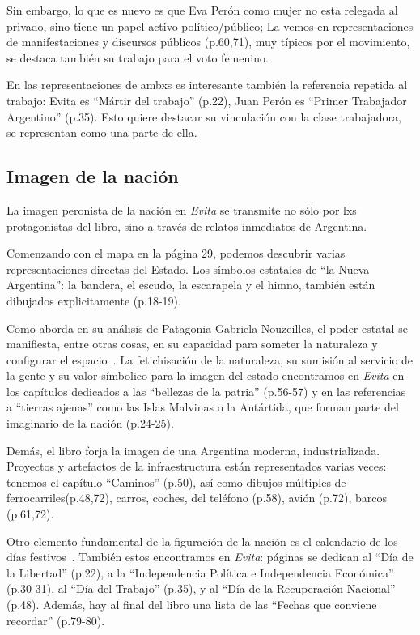 \documentclass[
10pt, %
a4paper, %
oneside, %
headinclude,footinclude, %
]{scrartcl}
\begin{document}
Sin embargo, lo que es nuevo es que Eva Perón como mujer no esta relegada al privado, sino tiene un papel activo político/público;
La vemos en representaciones de manifestaciones y discursos públicos (p.60,71), muy típicos por el movimiento, se destaca también su trabajo para el voto femenino.

En las representaciones de ambxs es interesante también la referencia repetida al trabajo:
Evita es ``Mártir del trabajo'' (p.22),
Juan Perón es ``Primer Trabajador Argentino'' (p.35).
Esto quiere destacar su vinculación con la clase trabajadora, se representan como una parte de ella.


\subsection{Imagen de la nación}

La imagen peronista de la nación en \textit{Evita} se transmite no sólo por lxs protagonistas del libro, sino a través de relatos inmediatos de Argentina.

Comenzando con el mapa en la página 29, podemos descubrir varias representaciones directas del Estado.
Los símbolos estatales de ``la Nueva Argentina'': la bandera, el escudo, la escarapela y el himno, también están dibujados explicitamente (p.18-19).

Como aborda en su análisis de Patagonia Gabriela Nouzeilles, el poder estatal se manifiesta, entre otras cosas, en su capacidad para someter la naturaleza y configurar el espacio~\autocite{Nou1999}.
La fetichisación de la naturaleza, su sumisión al servicio de la gente y su valor símbolico para la imagen del estado encontramos en \textit{Evita} en los capítulos dedicados a las ``bellezas de la patria'' (p.56-57) y en las referencias a ``tierras ajenas'' como las Islas Malvinas o la Antártida, que forman parte del imaginario de la nación (p.24-25).

Demás, el libro forja la imagen de una Argentina moderna, industrializada.
Proyectos y artefactos de la infraestructura están representados varias veces:
tenemos el capítulo ``Caminos'' (p.50), así como dibujos múltiples de ferrocarriles(p.48,72), carros, coches, del teléfono (p.58), avión (p.72), barcos (p.61,72).

Otro elemento fundamental de la figuración de la nación es el calendario de los días festivos~\autocite{SzIr2009}.
También estos encontramos en \textit{Evita}:
páginas se dedican al
``Día de la Libertad'' (p.22),
a la ``Independencia Política e Independencia Económica'' (p.30-31),
al ``Día del Trabajo'' (p.35),
y al ``Día de la Recuperación Nacional'' (p.48).
Además, hay al final del libro una lista de las ``Fechas que conviene recordar'' (p.79-80).
\end{document}
